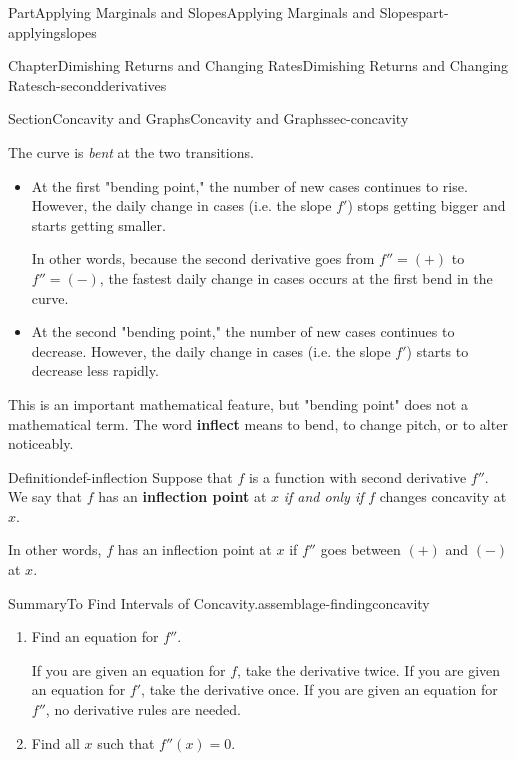 \documentclass{tufte-book}
\newcommand{\terminology}[1]{\textbf{#1}}
\numberwithin{equation}{chapter}
\def\drawtikzspline(#1,#2,#3,#4,#5,#6){ \draw[curve,domain=(#1):(#4)] plot (\x , { ( (((#3) + (#6))*(#1) - ((#3) + (#6))*(#4) - 2*(#2) + 2*(#5))/((#1)^3 - 3*((#1)^2)*(#4) + 3*(#1)*((#4)^2) - (#4)^3) )*((\x)^3) + ( -(((#3) + 2*(#6))*((#1)^2) + ((#3) - (#6))*(#1)*(#4) - (2*(#3) + (#6))*((#4)^2) - 3*((#1) + (#4))*(#2) + 3*((#1) + (#4))*(#5))/((#1)^3 - 3*((#1)^2)*(#4) + 3*(#1)*((#4)^2) - (#4)^3) ) *((\x)^2) + ( ((#6)*((#1)^3) + (2*(#3) + (#6))*((#1)^2)*(#4) - ((#3) + 2*(#6))*(#1)*((#4)^2) - (#3)*((#4)^3) - 6*(#1)*(#4)*(#2) + 6*(#1)*(#4)*(#5))/((#1)^3 - 3*((#1)^2)*(#4) + 3*(#1)*((#4)^2) - (#4)^3) ) * (\x) + ( -((#6)*((#1)^3)*(#4) + ((#3) - (#6))*((#1)^2)*(#4)^2 - (#3)*(#1)*((#4)^3) - (3*(#1)*((#4)^2) - (#4)^3)*(#2) - ((#1)^3 - 3*((#1)^2)*(#4))*(#5))/((#1)^3 - 3*((#1)^2)*(#4) + 3*(#1)*((#4)^2) - (#4)^3))}) }
\begin{document}
\begin{partptx}{Part}{Applying Marginals and Slopes}{}{Applying Marginals and Slopes}{}{}{part-applyingslopes}
\begin{chapterptx}{Chapter}{Dimishing Returns and Changing Rates}{}{Dimishing Returns and Changing Rates}{}{}{ch-secondderivatives}
\begin{sectionptx}{Section}{Concavity and Graphs}{}{Concavity and Graphs}{}{}{sec-concavity}
\begin{image}{0.35}{0.3}{0.35}{}
{
}%
\end{image}%
 The curve is \emph{bent} at the two transitions.%
\begin{itemize}[label=\textbullet]
\item{}At the first "bending point," the number of new cases continues to rise. However, the daily change in cases (i.e. the slope \(f'\)) stops getting bigger and starts getting smaller.%
\par
In other words, because the second derivative  goes from \(f''=(+)\) to \(f''=(-)\), the fastest daily change in cases occurs at the first bend in the curve.%
\item{}At the second "bending point," the number of new cases continues to decrease. However, the daily change in cases (i.e. the slope \(f'\)) starts to decrease less rapidly.%
\end{itemize}
This is an important mathematical feature, but "bending point" does not a mathematical term.  The word \terminology{inflect} means to bend, to change pitch, or to alter noticeably.%
\begin{definition}{Definition}{}{def-inflection}%
Suppose that \(f\) is a function with second derivative \(f''\). We say that \(f\) has an \terminology{inflection point} at \(x\) \emph{if and only if} \(f\) changes concavity at \(x\).%
\par
In other words, \(f\) has an inflection point at \(x\) if \(f''\) goes between \((+)\) and \((-)\) at \(x\).%
\end{definition}
\begin{assemblage}{Summary}{To Find Intervals of Concavity.}{assemblage-findingconcavity}%
%
\begin{enumerate}
\item{}Find an equation for \(f''\).%
\par
If you are given an equation for \(f\), take the derivative twice. If you are given an equation for \(f'\), take the derivative once. If you are given an equation for \(f''\), no derivative rules are needed.%
\item{}Find all \(x\) such that \(f''(x)=0\).%

\end{enumerate}
\end{assemblage}
\end{sectionptx}
\end{chapterptx}
\end{partptx}
\end{document}
